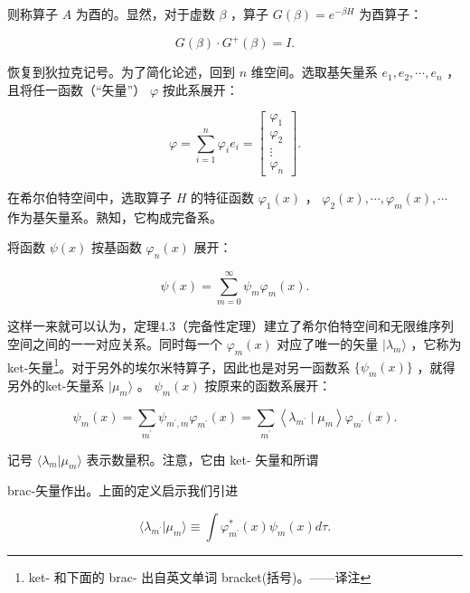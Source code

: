 则称算子 $A$ 为酉的。显然，对于虚数 $\beta$ ，算子 $G(\beta) = e^{-\beta H}$ 为酉算子：

\begin{equation*}
G (\beta) \cdot G ^ {+} (\beta) = I.
\end{equation*}

恢复到狄拉克记号。为了简化论述，回到 $n$ 维空间。选取基矢量系 $e_{1}, e_{2}, \cdots, e_{n}$ ，且将任一函数（“矢量”） $\varphi$ 按此系展开：

\begin{equation*}
\varphi = \sum_ {i = 1} ^ {n} \varphi_ {i} e _ {i} = \left[ \begin{array}{c} \varphi_ {1} \\ \varphi_ {2} \\ \vdots \\ \varphi_ {n} \end{array} \right].
\end{equation*}

在希尔伯特空间中，选取算子 $H$ 的特征函数 $\varphi_{1}(x)$ ， $\varphi_{2}(x),\cdots,\varphi_{m}(x),\cdots$ 作为基矢量系。熟知，它构成完备系。

将函数 $\psi(x)$ 按基函数 $\varphi_{n}(x)$ 展开：

\begin{equation*}
\psi (x) = \sum_ {m = 0} ^ {\infty} \psi_ {m} \varphi_ {m} (x).
\end{equation*}

这样一来就可以认为，定理4.3（完备性定理）建立了希尔伯特空间和无限维序列空间之间的一一对应关系。同时每一个 $\varphi_{m}(x)$ 对应了唯一的矢量 $|\lambda_{m}\rangle$ ，它称为ket-矢量\footnote{ket- 和下面的 brac- 出自英文单词 bracket(括号)。——译注}。对于另外的埃尔米特算子，因此也是对另一函数系 $\{\psi_m(x)\}$ ，就得另外的ket-矢量系 $|\mu_m\rangle$ 。 $\psi_{m}(x)$ 按原来的函数系展开：

\begin{equation*}
\psi_ {m} (x) = \sum_ {m ^ {\prime}} \psi_ {m ^ {\prime}, m} \varphi_ {m ^ {\prime}} (x) = \sum_ {m ^ {\prime}} \left\langle \lambda_ {m ^ {\prime}} \mid \mu_ {m} \right\rangle \varphi_ {m ^ {\prime}} (x).
\end{equation*}

记号 $\langle\lambda_{m}|\mu_{m}\rangle$ 表示数量积。注意，它由 ket- 矢量和所谓

brac-矢量作出。上面的定义启示我们引进

\begin{equation*}
\langle \lambda_ {m ^ {\prime}} | \mu_ {m} \rangle \equiv \int \varphi_ {m ^ {\prime}} ^ {*} (x) \psi_ {m} (x) d \tau .
\end{equation*}


